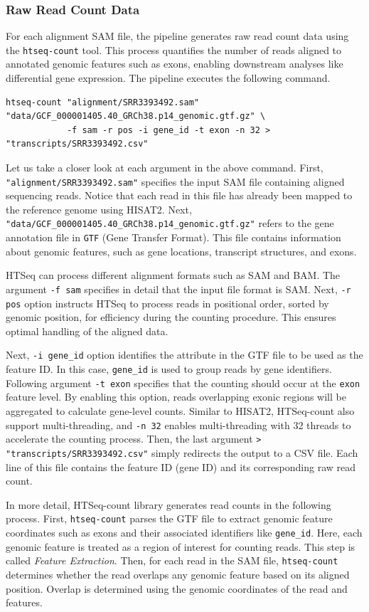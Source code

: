 \documentclass{article}
\begin{document}
\subsubsection{Raw Read Count Data}  
For each alignment SAM file, the pipeline generates raw read count data using the \texttt{htseq-count} tool. This process quantifies the number of reads aligned to annotated genomic features such as exons, enabling downstream analyses like differential gene expression. The pipeline executes the following command.
\begin{verbatim}
htseq-count "alignment/SRR3393492.sam" "data/GCF_000001405.40_GRCh38.p14_genomic.gtf.gz" \
            -f sam -r pos -i gene_id -t exon -n 32 > "transcripts/SRR3393492.csv"
\end{verbatim}
Let us take a closer look at each argument in the above command. First, \texttt{"alignment/SRR3393492.sam"} specifies the input SAM file containing aligned sequencing reads. Notice that each read in this file has already been mapped to the reference genome using HISAT2. Next, \texttt{"data/GCF\_000001405.40\_GRCh38.p14\_genomic.gtf.gz"} refers to the gene annotation file in \texttt{GTF} (Gene Transfer Format). This file contains information about genomic features, such as gene locations, transcript structures, and exons.

HTSeq can process different alignment formats such as SAM and BAM. The argument \texttt{-f sam} specifies in detail that the input file format is SAM. Next, \texttt{-r pos} option instructs HTSeq to process reads in positional order, sorted by genomic position, for efficiency during the counting procedure. This ensures optimal handling of the aligned data.

Next, \texttt{-i gene\_id} option identifies the attribute in the GTF file to be used as the feature ID. In this case, \texttt{gene\_id} is used to group reads by gene identifiers. Following argument \texttt{-t exon} specifies that the counting should occur at the \texttt{exon} feature level. By enabling this option, reads overlapping exonic regions will be aggregated to calculate gene-level counts. Similar to HISAT2, HTSeq-count also support multi-threading, and \texttt{-n 32} enables multi-threading with 32 threads to accelerate the counting process. Then, the last argument \texttt{> "transcripts/SRR3393492.csv"} simply redirects the output to a CSV file. Each line of this file contains the feature ID (gene ID) and its corresponding raw read count.

In more detail, HTSeq-count library generates read counts in the following process. First, \texttt{htseq-count} parses the GTF file to extract genomic feature coordinates such as exons and their associated identifiers like \texttt{gene\_id}. Here, each genomic feature is treated as a region of interest for counting reads. This step is called \emph{Feature Extraction}. Then, for each read in the SAM file, \texttt{htseq-count} determines whether the read overlaps any genomic feature based on its aligned position. Overlap is determined using the genomic coordinates of the read and features.
\end{document}
